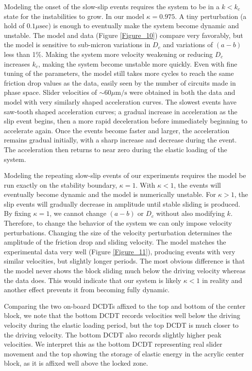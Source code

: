 Modeling the onset of the slow-slip events requires the system to be in a $k<k_c$ state for the instabilities to grow. In our model $\kappa=0.975$. A tiny perturbation (a hold of $0.1 \mu\text{sec}$) is enough to eventually make the system become dynamic and unstable. The model and data (Figure \ref{Figure_10}) compare very favorably, but the model is sensitive to sub-micron variations in $D_c$ and variations of $(a-b)$ less than 1\%. Making the system more velocity weakening or reducing $D_c$ increases $k_c$, making the system become unstable more quickly. Even with fine tuning of the parameters, the model still takes more cycles to reach the same friction drop values as the data, easily seen by the number of circuits made in phase space. Slider velocities of $\sim 60 \mu\text{m/s}$ were obtained in both the data and model with very similarly shaped acceleration curves. The slowest events have saw-tooth shaped acceleration curves; a gradual increase in acceleration as the slip event begins, then a more rapid deceleration before immediately beginning to accelerate again. Once the events become faster and larger, the acceleration remains gradual initially, with a sharp increase and decrease during the event. The acceleration then returns to near zero during the elastic loading of the system.

Modeling the repeating slow-slip events of our experiments requires the model be run exactly on the stability boundary, $\kappa=1$. With $\kappa<1$, the events will eventually become dynamic and the model is numerically unstable. For $\kappa>1$, the slip events will gradually decrease in amplitude until stable sliding is produced. By fixing $\kappa=1$, we cannot change $(a-b)$ or $D_c$ without also modifying $k$. Therefore, to change the behavior of the system we can only impose velocity perturbations. Changing the size of the velocity perturbation determines the amplitude of the friction drop and sliding velocity. The model matches the experimental data very well (Figure \ref{Figure_11}), producing events with very similar velocities, but slightly longer periods. The most obvious difference is that the model never shows the block sliding much below the driving velocity whereas the data does. This would indicate that our system is likely $\kappa<1$ in reality and another effect prevents it from becoming fully dynamic.

Comparing the two on-board DCDTs affixed to the top and bottom of the center block, we note that the bottom DCDT records velocities well below the driving velocity during the elastic loading period, but the top DCDT is much closer to the driving velocity. The bottom DCDT also records slightly higher peak velocities. We interpret this as the bottom DCDT representing real slider movement and the top showing the storage of elastic energy in the acrylic center block, as it is affixed well above the locked zone.

